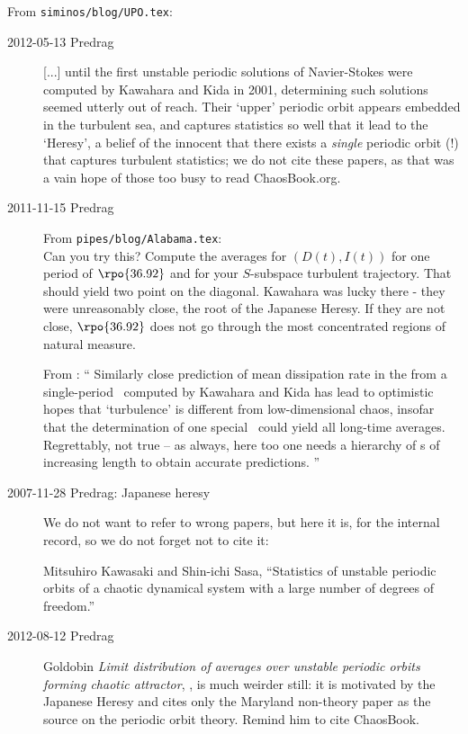 From \texttt{siminos/blog/UPO.tex}:
\begin{description}
\item[2012-05-13  Predrag] [...] until the first unstable periodic solutions of
Navier-Stokes were computed by Kawahara and Kida in 2001,
determining such solutions seemed utterly out of reach. Their
`upper' periodic orbit appears embedded in the turbulent sea, and
captures statistics so well that it lead to the `Heresy', a belief of the
innocent that there exists a \emph{single} periodic orbit (!) that
captures turbulent statistics; we do not cite these papers, as
that was a vain hope of those too busy to read ChaosBook.org.

\item[2011-11-15  Predrag] From \texttt{pipes/blog/Alabama.tex}:
\\
Can you try this?
Compute the averages for $(D(t),I(t))$ for one period of
$\rpo{36.92}$ and for your $S$-subspace turbulent trajectory. That should
yield two point on the diagonal.  Kawahara was lucky there - they were
unreasonably close, the root of the Japanese Heresy. If they are not close,
$\rpo{36.92}$ does not go through the most concentrated regions of natural
measure.

From : ``
Similarly close prediction of mean dissipation rate in the
 from a single-period \po\ computed by
Kawahara and Kida has lead to
optimistic hopes that `turbulence' is different from
low-dimensional chaos, insofar that the determination of one special
\po\ could yield all long-time averages.
Regrettably, not true -- as always, here too one needs a hierarchy
of \po s of increasing length to obtain accurate
predictions.
    ''


\item[2007-11-28 Predrag: Japanese heresy]
We do not want to refer to wrong papers, but here it is, for
the internal record, so we do not forget not to cite it:

Mitsuhiro Kawasaki and Shin-ichi Sasa,
    ``Statistics of unstable periodic orbits of a chaotic dynamical system
    with a large number of degrees of freedom.''

\item[2012-08-12  Predrag]
Goldobin \emph{Limit distribution of averages over
unstable periodic orbits forming chaotic attractor}, ,
is much weirder still: it is motivated by the Japanese Heresy and cites
only the Maryland non-theory paper as the source on the periodic orbit
theory.  Remind him to cite ChaosBook.

\end{description}


